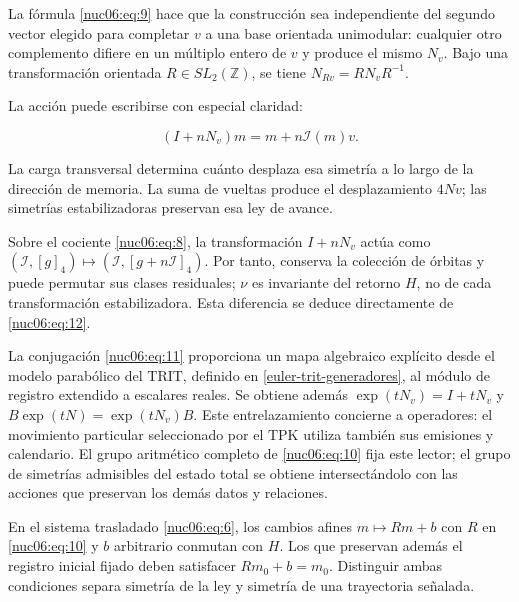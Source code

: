La fórmula \eqref{nuc06:eq:9} hace que la construcción sea independiente del segundo vector elegido para completar \(v\) a una base orientada unimodular: cualquier otro complemento difiere en un múltiplo entero de \(v\) y produce el mismo \(N_v\). Bajo una transformación orientada \(R\in SL_2(\mathbb Z)\), se tiene \(N_{Rv}=RN_vR^{-1}\).

La acción puede escribirse con especial claridad:

\begin{equation}
(I+nN_v)m=m+n\mathcal I(m)v.
\label{nuc06:eq:12}
\end{equation}

La carga transversal determina cuánto desplaza esa simetría a lo largo de la dirección de memoria. La suma de vueltas produce el desplazamiento \(4Nv\); las simetrías estabilizadoras preservan esa ley de avance.

Sobre el cociente \eqref{nuc06:eq:8}, la transformación \(I+nN_v\) actúa como \((\mathcal I,[g]_4)\mapsto(\mathcal I,[g+n\mathcal I]_4)\). Por tanto, conserva la colección de órbitas y puede permutar sus clases residuales; \(\nu\) es invariante del retorno \(H\), no de cada transformación estabilizadora. Esta diferencia se deduce directamente de \eqref{nuc06:eq:12}.

La conjugación \eqref{nuc06:eq:11} proporciona un mapa algebraico explícito desde el modelo parabólico del TRIT, definido en \cref{euler-trit-generadores}, al módulo de registro extendido a escalares reales. Se obtiene además \(\exp(tN_v)=I+tN_v\) y \(B\exp(tN)=\exp(tN_v)B\). Este entrelazamiento concierne a operadores: el movimiento particular seleccionado por el TPK utiliza también sus emisiones y calendario. El grupo aritmético completo de \eqref{nuc06:eq:10} fija este lector; el grupo de simetrías admisibles del estado total se obtiene intersectándolo con las acciones que preservan los demás datos y relaciones.

En el sistema trasladado \eqref{nuc06:eq:6}, los cambios afines \(m\mapsto Rm+b\) con \(R\) en \eqref{nuc06:eq:10} y \(b\) arbitrario conmutan con \(H\). Los que preservan además el registro inicial fijado deben satisfacer \(Rm_0+b=m_0\). Distinguir ambas condiciones separa simetría de la ley y simetría de una trayectoria señalada.

